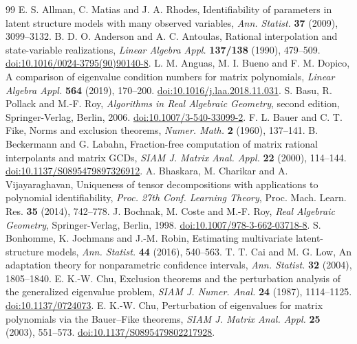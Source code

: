 \begin{thebibliography}{99}
 E. S. Allman, C. Matias and J. A. Rhodes,
Identifiability of parameters in latent structure models with many
observed variables, \emph{Ann. Statist.} \textbf{37} (2009), 3099--3132.
 B. D. O. Anderson and A. C. Antoulas,
Rational interpolation and state-variable realizations,
\emph{Linear Algebra Appl.} \textbf{137/138} (1990), 479--509.
\href{https://doi.org/10.1016/0024-3795(90)90140-8}{doi:10.1016/0024-3795(90)90140-8}.
 L. M. Anguas, M. I. Bueno and F. M. Dopico,
A comparison of eigenvalue condition numbers for matrix polynomials,
\emph{Linear Algebra Appl.} \textbf{564} (2019), 170--200.
\href{https://doi.org/10.1016/j.laa.2018.11.031}{doi:10.1016/j.laa.2018.11.031}.
 S. Basu, R. Pollack and M.-F. Roy,
\emph{Algorithms in Real Algebraic Geometry}, second edition,
Springer-Verlag, Berlin, 2006.
\href{https://doi.org/10.1007/3-540-33099-2}{doi:10.1007/3-540-33099-2}.
 F. L. Bauer and C. T. Fike,
Norms and exclusion theorems, \emph{Numer. Math.} \textbf{2} (1960), 137--141.
 B. Beckermann and G. Labahn,
Fraction-free computation of matrix rational interpolants and matrix GCDs,
\emph{SIAM J. Matrix Anal. Appl.} \textbf{22} (2000), 114--144.
\href{https://doi.org/10.1137/S0895479897326912}{doi:10.1137/S0895479897326912}.
 A. Bhaskara, M. Charikar and A. Vijayaraghavan,
Uniqueness of tensor decompositions with applications to polynomial
identifiability, \emph{Proc. 27th Conf. Learning Theory},
Proc. Mach. Learn. Res. \textbf{35} (2014), 742--778.
 J. Bochnak, M. Coste and M.-F. Roy,
\emph{Real Algebraic Geometry}, Springer-Verlag, Berlin, 1998.
\href{https://doi.org/10.1007/978-3-662-03718-8}{doi:10.1007/978-3-662-03718-8}.
 S. Bonhomme, K. Jochmans and J.-M. Robin,
Estimating multivariate latent-structure models,
\emph{Ann. Statist.} \textbf{44} (2016), 540--563.
 T. T. Cai and M. G. Low,
An adaptation theory for nonparametric confidence intervals,
\emph{Ann. Statist.} \textbf{32} (2004), 1805--1840.
 E. K.-W. Chu,
Exclusion theorems and the perturbation analysis of the generalized
eigenvalue problem, \emph{SIAM J. Numer. Anal.} \textbf{24} (1987),
1114--1125. \href{https://doi.org/10.1137/0724073}{doi:10.1137/0724073}.
 E. K.-W. Chu,
Perturbation of eigenvalues for matrix polynomials via the Bauer--Fike
theorems, \emph{SIAM J. Matrix Anal. Appl.} \textbf{25} (2003), 551--573.
\href{https://doi.org/10.1137/S0895479802217928}{doi:10.1137/S0895479802217928}.

\end{thebibliography}
